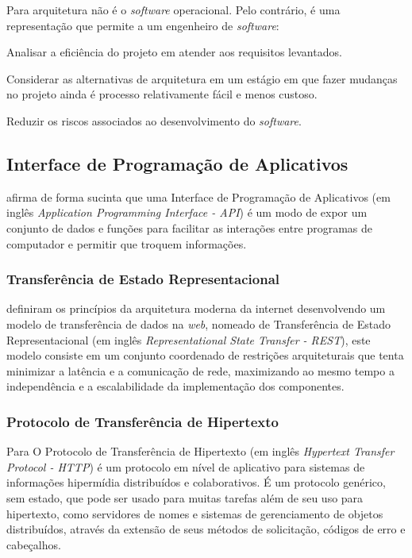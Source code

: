 Para  arquitetura não é o \textit{software} operacional. Pelo contrário, é uma representação que permite a um engenheiro de \textit{software}:

\begin{lista}
\item Analisar a eficiência do projeto em atender aos requisitos levantados.
\item Considerar as alternativas de arquitetura em um estágio em que fazer mudanças no projeto ainda é processo relativamente fácil e menos custoso.
\item Reduzir os riscos associados ao desenvolvimento do \textit{software}.
\end{lista}

\subsection{Interface de Programação de Aplicativos}

 afirma de forma sucinta que uma Interface de Programação de Aplicativos (em inglês \textit{Application Programming Interface - API}) é um modo de expor um conjunto de dados e funções para facilitar as interações entre programas de computador e permitir que troquem informações.

\subsubsection{Transferência de Estado Representacional}

 definiram os princípios da arquitetura moderna da internet desenvolvendo um modelo de transferência de dados na \textit{web}, nomeado de Transferência de Estado Representacional (em inglês \textit{Representational State Transfer - REST}), este modelo consiste em um conjunto coordenado de restrições arquiteturais que tenta minimizar a latência e a comunicação de rede, maximizando ao mesmo tempo a independência e a escalabilidade da implementação dos componentes.

\subsubsection{Protocolo de Transferência de Hipertexto}

Para  O Protocolo de Transferência de Hipertexto (em inglês \textit{Hypertext Transfer Protocol - HTTP}) é um protocolo em nível de aplicativo para sistemas de informações hipermídia distribuídos e colaborativos. É um protocolo genérico, sem estado, que pode ser usado para muitas tarefas além de seu uso para hipertexto, como servidores de nomes e sistemas de gerenciamento de objetos distribuídos, através da extensão de seus métodos de solicitação, códigos de erro e cabeçalhos.

